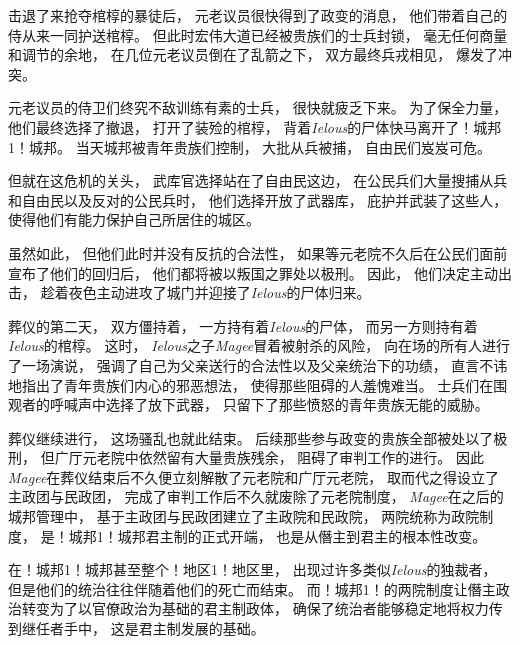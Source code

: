 \documentclass[12pt, a4paper]{ctexart}
\begin{document}
        击退了来抢夺棺椁的暴徒后，
        元老议员很快得到了政变的消息，
        他们带着自己的侍从来一同护送棺椁。
        但此时宏伟大道已经被贵族们的士兵封锁，
        毫无任何商量和调节的余地，
        在几位元老议员倒在了乱箭之下，
        双方最终兵戎相见，
        爆发了冲突。

        元老议员的侍卫们终究不敌训练有素的士兵，
        很快就疲乏下来。
        为了保全力量，
        他们最终选择了撤退，
        打开了装殓的棺椁，
        背着\emph{Ielous}的尸体快马离开了！城邦1！城邦。
        当天城邦被青年贵族们控制，
        大批从兵被捕，
        自由民们岌岌可危。

        但就在这危机的关头，
        武库官选择站在了自由民这边，
        在公民兵们大量搜捕从兵和自由民以及反对的公民兵时，
        他们选择开放了武器库，
        庇护并武装了这些人，
        使得他们有能力保护自己所居住的城区。

        虽然如此，
        但他们此时并没有反抗的合法性，
        如果等元老院不久后在公民们面前宣布了他们的回归后，
        他们都将被以叛国之罪处以极刑。
        因此，
        他们决定主动出击，
        趁着夜色主动进攻了城门并迎接了\emph{Ielous}的尸体归来。

        葬仪的第二天，
        双方僵持着，
        一方持有着\emph{Ielous}的尸体，
        而另一方则持有着\emph{Ielous}的棺椁。
        这时，
        \emph{Ielous}之子\emph{Magee}冒着被射杀的风险，
        向在场的所有人进行了一场演说，
        强调了自己为父亲送行的合法性以及父亲统治下的功绩，
        直言不讳地指出了青年贵族们内心的邪恶想法，
        使得那些阻碍的人羞愧难当。
        士兵们在围观者的呼喊声中选择了放下武器，
        只留下了那些愤怒的青年贵族无能的威胁。

        葬仪继续进行，
        这场骚乱也就此结束。
        后续那些参与政变的贵族全部被处以了极刑，
        但广厅元老院中依然留有大量贵族残余，
        阻碍了审判工作的进行。
        因此\emph{Magee}在葬仪结束后不久便立刻解散了元老院和广厅元老院，
        取而代之得设立了主政团与民政团，
        完成了审判工作后不久就废除了元老院制度，
        \emph{Magee}在之后的城邦管理中，
        基于主政团与民政团建立了主政院和民政院，
        两院统称为政院制度，
        是！城邦1！城邦君主制的正式开端，
        也是从僭主到君主的根本性改变。

        在！城邦1！城邦甚至整个！地区1！地区里，
        出现过许多类似\emph{Ielous}的独裁者，
        但是他们的统治往往伴随着他们的死亡而结束。
        而！城邦1！的两院制度让僭主政治转变为了以官僚政治为基础的君主制政体，
        确保了统治者能够稳定地将权力传到继任者手中，
        这是君主制发展的基础。
\end{document}
